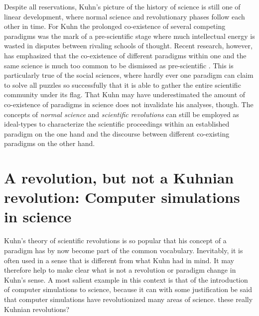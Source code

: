 \documentclass[12pt, a4paper]{article}
\begin{document}
Despite all reservations, Kuhn's picture of the history of science is
still one of linear development, where normal science and
revolutionary phases follow each other in time. For Kuhn the prolonged
co-existence of several competing paradigms was the mark of a
pre-scientific stage where much intellectual energy is wasted in
disputes between rivaling schools of thought. Recent research,
however, has emphasized that the co-existence of different paradigms
within one and the same science is much too common to be dismissed as
pre-scientific \citep{kornmesser:2014, schurz:2014}. This is
particularly true of the social sciences, where hardly ever one
paradigm can claim to solve all puzzles so successfully that it is
able to gather the entire scientific community under its flag. That
Kuhn may have underestimated the amount of co-existence of paradigms
in science does not invalidate his analyses, though. The concepts of
{\em normal science} and {\em scientific revolutions} can still be
employed as ideal-types to characterize the scientific proceedings
within an established paradigm on the one hand and the discourse
between different co-existing paradigms on the other hand.


\section{A revolution, but not a Kuhnian revolution: Computer
simulations in science}

\label{sec:rev}

Kuhn's theory of scientific revolutions is so popular that his concept
of a paradigm has by now become part of the common vocabulary.
Inevitably, it is often used in a sense that is different from what
Kuhn had in mind. It may therefore help to make clear what is not a
revolution or paradigm change in Kuhn's sense. A most salient example
in this context is that of the introduction of computer simulations to
science, because it can with some justification be said that computer
simulations have revolutionized many areas of science. %
these really Kuhnian revolutions?

\end{document}
